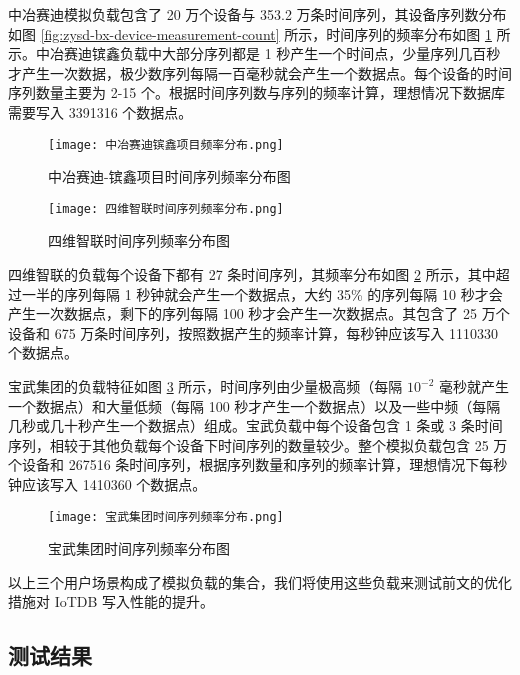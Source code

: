 中冶赛迪模拟负载包含了 20 万个设备与 353.2 万条时间序列，其设备序列数分布如图 \ref{fig:zysd-bx-device-measurement-count} 所示，时间序列的频率分布如图 \ref{fig:zysd-bx-freq-distribution} 所示。中冶赛迪镔鑫负载中大部分序列都是 1 秒产生一个时间点，少量序列几百秒才产生一次数据，极少数序列每隔一百毫秒就会产生一个数据点。每个设备的时间序列数量主要为 2-15 个。根据时间序列数与序列的频率计算，理想情况下数据库需要写入 3391316 个数据点。

\begin{figure}
  \centering
  \texttt{[image: 中冶赛迪镔鑫项目频率分布.png]}
  \caption{中冶赛迪-镔鑫项目时间序列频率分布图}
  \label{fig:zysd-bx-freq-distribution}
\end{figure}


\begin{figure}
  \centering
  \texttt{[image: 四维智联时间序列频率分布.png]}
  \caption{四维智联时间序列频率分布图}
  \label{fig:swzl-freq-distribution}
\end{figure} 

四维智联的负载每个设备下都有 27 条时间序列，其频率分布如图 \ref{fig:swzl-freq-distribution} 所示，其中超过一半的序列每隔 1 秒钟就会产生一个数据点，大约 35\% 的序列每隔 10 秒才会产生一次数据点，剩下的序列每隔 100 秒才会产生一次数据点。其包含了 25 万个设备和 675 万条时间序列，按照数据产生的频率计算，每秒钟应该写入 1110330 个数据点。


宝武集团的负载特征如图 \ref{fig:bw-freq-distribution} 所示，时间序列由少量极高频（每隔 $10^{-2}$ 毫秒就产生一个数据点）和大量低频（每隔 100 秒才产生一个数据点）以及一些中频（每隔几秒或几十秒产生一个数据点）组成。宝武负载中每个设备包含 1 条或 3 条时间序列，相较于其他负载每个设备下时间序列的数量较少。整个模拟负载包含 25 万个设备和 267516 条时间序列，根据序列数量和序列的频率计算，理想情况下每秒钟应该写入 1410360 个数据点。

\begin{figure}
  \centering
  \texttt{[image: 宝武集团时间序列频率分布.png]}
  \caption{宝武集团时间序列频率分布图}
  \label{fig:bw-freq-distribution}
\end{figure}


以上三个用户场景构成了模拟负载的集合，我们将使用这些负载来测试前文的优化措施对 IoTDB 写入性能的提升。 
\subsection{测试结果}

